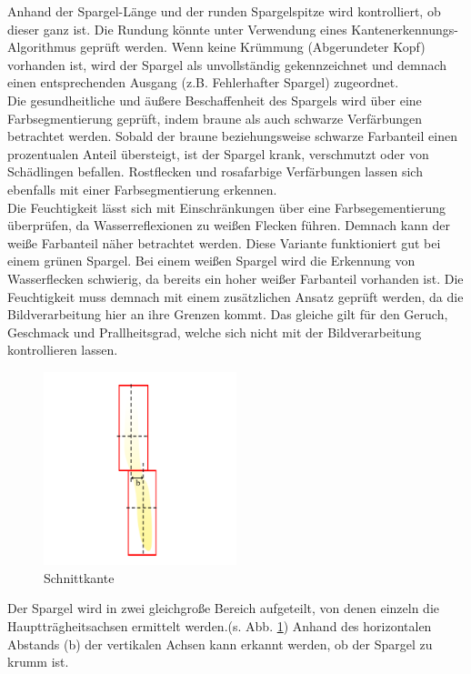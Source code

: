 \documentclass{ezb}
\begin{document}
Anhand der Spargel-Länge und der runden Spargelspitze wird kontrolliert, ob dieser ganz ist. Die Rundung könnte unter Verwendung eines Kantenerkennungs-Algorithmus geprüft werden. Wenn keine Krümmung (Abgerundeter Kopf) vorhanden ist, wird der Spargel als unvollständig gekennzeichnet und demnach einen entsprechenden Ausgang (z.B. \glqq Fehlerhafter Spargel\grqq) zugeordnet.\\
Die gesundheitliche und äußere Beschaffenheit des Spargels wird über eine Farbsegmentierung geprüft, indem braune als auch schwarze Verfärbungen betrachtet werden. Sobald der braune beziehungsweise schwarze Farbanteil einen prozentualen Anteil übersteigt, ist der Spargel krank, verschmutzt oder von Schädlingen befallen. Rostflecken und rosafarbige Verfärbungen lassen sich ebenfalls mit einer Farbsegmentierung erkennen.\\
Die Feuchtigkeit lässt sich mit Einschränkungen über eine Farbsegementierung überprüfen, da Wasserreflexionen zu weißen Flecken führen. Demnach kann der weiße Farbanteil näher betrachtet werden. Diese Variante funktioniert gut bei einem grünen Spargel. Bei einem weißen Spargel wird die Erkennung von Wasserflecken schwierig, da bereits ein hoher weißer Farbanteil vorhanden ist. Die Feuchtigkeit muss demnach mit einem zusätzlichen Ansatz geprüft werden, da die Bildverarbeitung hier an ihre Grenzen kommt. Das gleiche gilt für den Geruch, Geschmack und Prallheitsgrad, welche sich nicht mit der Bildverarbeitung kontrollieren lassen.\\
\begin{figure}
\includegraphics[width=0.5\textwidth]{schief.png}
\caption{\label{fig:schief}Schnittkante}
\end{figure}
Der Spargel wird in zwei gleichgroße Bereich aufgeteilt, von denen einzeln die Hauptträgheitsachsen ermittelt werden.(s. Abb. \ref{fig:schief})
Anhand des horizontalen Abstands (b) der vertikalen Achsen kann erkannt werden, ob der Spargel zu krumm ist.
\end{document}
